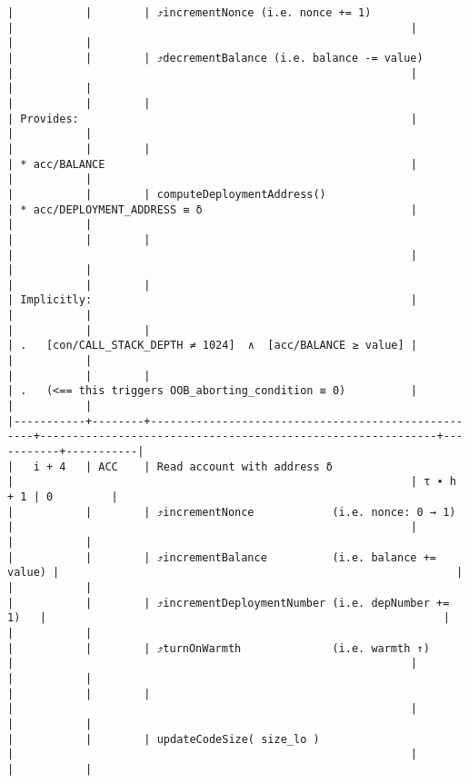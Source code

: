 \documentclass[varwidth=\maxdimen,margin=0.5cm,multi={verbatim}]{standalone}
\begin{document}
\begin{verbatim}
|           |        | ⤴️incrementNonce (i.e. nonce += 1)                  |                                                             |           |           |
|           |        | ⤴️decrementBalance (i.e. balance -= value)          |                                                             |           |           |
|           |        |                                                    | Provides:                                                   |           |           |
|           |        |                                                    | * acc/BALANCE                                               |           |           |
|           |        | computeDeploymentAddress()                         | * acc/DEPLOYMENT_ADDRESS ≡ δ                                |           |           |
|           |        |                                                    |                                                             |           |           |
|           |        |                                                    | Implicitly:                                                 |           |           |
|           |        |                                                    | .   [con/CALL_STACK_DEPTH ≠ 1024]  ∧  [acc/BALANCE ≥ value] |           |           |
|           |        |                                                    | .   (<== this triggers OOB_aborting_condition ≡ 0)          |           |           |
|-----------+--------+----------------------------------------------------+-------------------------------------------------------------+-----------+-----------|
|   i + 4   | ACC    | Read account with address δ                        |                                                             | τ ∙ h + 1 | 0         |
|           |        | ⤴️incrementNonce            (i.e. nonce: 0 → 1)     |                                                             |           |           |
|           |        | ⤴️incrementBalance          (i.e. balance += value) |                                                             |           |           |
|           |        | ⤴️incrementDeploymentNumber (i.e. depNumber += 1)   |                                                             |           |           |
|           |        | ⤴️turnOnWarmth              (i.e. warmth ↑)         |                                                             |           |           |
|           |        |                                                    |                                                             |           |           |
|           |        | updateCodeSize( size_lo )                          |                                                             |           |           |

\end{verbatim}
\end{document}
